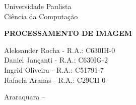 \begin{center}
	\Huge Universidade Paulista\\
	\large Ciência da Computação
	
	\vfill
	
	\textbf{\MakeUppercase{Processamento de Imagem}}
	
	\vfill
	
	\normalsize{
		Aleksander Rocha - R.A.: C630IH-0\\
		Daniel Jançanti - R.A.: C630IG-2\\
		Ingrid Oliveira - R.A.: C51791-7\\
		Rafaela Aranas - R.A.: C29CII-0\\
	}
	
	\vfill
	
	Araraquara -- \the\year

\end{center}

\thispagestyle{empty}
